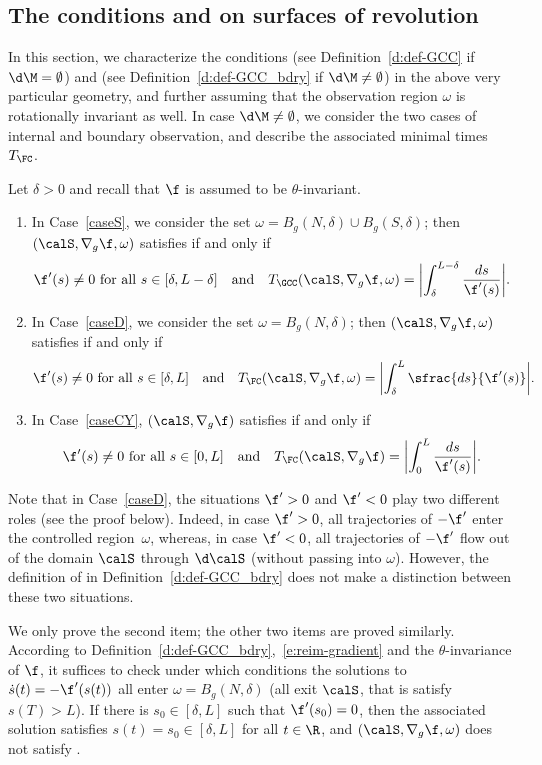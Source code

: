\subsection{The conditions \pGCC and \pFC on surfaces of revolution}
\label{s:minimal-time-limit-equation}
In this section, we characterize the conditions \pGCC (see Definition~\ref{d:def-GCC} if $\d\M=\emptyset$) and \pFC (see Definition~\ref{d:def-GCC_bdry} if $\d\M\neq \emptyset$) in the above very particular geometry, and further assuming that the observation region $\omega$ is rotationally invariant as well. In case $\d\M \neq \emptyset$, we consider the two cases of internal and boundary observation, and describe the associated minimal times $T_{\FC}$.

\begin{proposition}
\label{p:GCCFCrot}
Let $\delta>0$ and recall that $\f$ is assumed to be $\theta$-invariant.
\begin{enumerate}
\item In Case~\ref{caseS}, we consider the set $\omega = B_g(N, \delta) \cup B_g(S, \delta)$; then $(\calS,\nabla_g\f,\omega)$ satisfies \pGCC if and only if
\[
\f'(s) \neq 0\text{ for all }s \in [\delta, L-\delta]\quad\text{and}\quad T_{\GCC}(\calS,\nabla_g\f,\omega) = \biggl| \int_\delta^{L-\delta} \frac{ds}{\f'(s)} \biggr|.
\]
\item In Case~\ref{caseD}, we consider the set $\omega = B_g(N, \delta)$; then $(\calS,\nabla_g\f,\omega)$ satisfies \pFC if and only if
\[
\f'(s) \neq 0\text{ for all }s \in [\delta, L]\quad\text{and}\quad T_{\FC}(\calS,\nabla_g\f,\omega) = \biggl| \int_\delta^{L} \sfrac{ds}{\f'(s)} \biggr|.
\]
\item In Case~\ref{caseCY}, $(\calS,\nabla_g\f)$ satisfies \pFC if and only if
\[
\f'(s) \neq 0\text{ for all }s \in [0, L]\quad\text{and}\quad T_{\FC}(\calS,\nabla_g\f) = \biggl| \int_0^{L} \frac{ds}{\f'(s)} \biggr|.
\]
\end{enumerate}
\end{proposition}
Note that in Case~\ref{caseD}, the situations $\f'>0$ and $\f'<0$ play two different roles (see the proof below). Indeed, in case $\f'>0$, all trajectories of $-\f'$ enter the controlled region~$\omega$, whereas, in case $\f'<0$, all trajectories of $-\f'$ flow out of the domain $\calS$ through $\d\calS$ (without passing into $\omega$).
However, the definition of \pFC in Definition~\ref{d:def-GCC_bdry} does not make a distinction between these two situations.

\bnp
We only prove the second item; the other two items are proved similarly.
According to Definition~\ref{d:def-GCC_bdry},~\eqref{e:reim-gradient} and the $\theta$-invariance of $\f$, it suffices to check under which conditions the solutions to $\dot{s}(t)= - \f'(s(t))$ all enter $\omega = B_g(N, \delta)$ (\resp all exit $\calS$, that is satisfy $s(T)>L$).
If there is $s_0 \in [\delta, L]$ such that $\f'(s_0) = 0$, then the associated solution satisfies $s(t) = s_0\in [\delta, L]$ for all $t\in \R$, and $(\calS,\nabla_g\f,\omega)$ does not satisfy \pFC.

